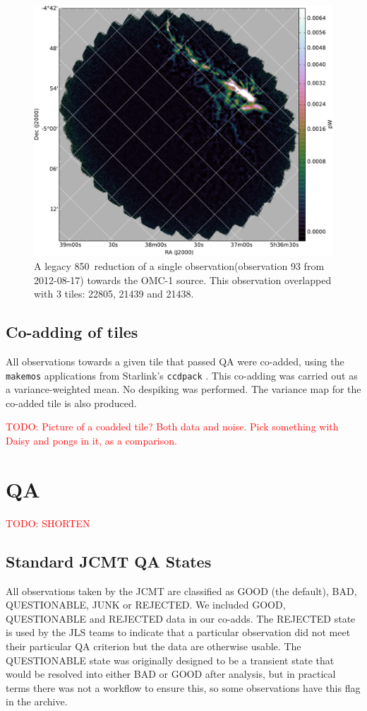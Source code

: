 \documentclass[twocolumn]{aastex6}
\newcommand{\um}{\micron}
\newcommand{\todo}[1]{\textcolor{red}{TODO: #1}}
\newcommand{\ascl}[1]{\href{http://www.ascl.net/#1}{ascl:#1}}
\newcommand{\status}[1]{\textsf{#1}}
\begin{document}
\begin{figure}
  \centering
  \includegraphics[width=0.6\linewidth]{omc1_example_legacy}
  \caption{A legacy 850\,\um{} reduction of a single
    observation(observation 93 from 2012-08-17) towards the OMC-1
    source. This observation overlapped with 3 tiles: 22805, 21439 and
    21438. }
  \label{fig:omc1-example}
    \end{figure}


\subsection{Co-adding of tiles}
All observations towards a given tile that passed QA were co-added,
using the \texttt{makemos} applications from Starlink's
\texttt{ccdpack} \citep[][\ascl{1403.021}]{SUN139}. This co-adding was
carried out as a variance-weighted mean. No despiking was
performed. The variance map for the co-added tile is also produced.

\todo{Picture of a coadded tile? Both data and noise. Pick something
with Daisy and pongs in it, as a comparison.}




\section{QA}
\label{sec:QA}
\todo{SHORTEN}

\subsection{Standard JCMT QA States}
All observations taken by the JCMT are classified as \status{GOOD}
(the default), \status{BAD}, \status{QUESTIONABLE}, \status{JUNK} or
\status{REJECTED}. We included \status{GOOD}, \status{QUESTIONABLE}
and \status{REJECTED} data in our co-adds. The \status{REJECTED} state
is used by the JLS teams to indicate that a particular observation did
not meet their particular QA criterion but the data are otherwise
usable. The \status{QUESTIONABLE} state was originally designed to be
a transient state that would be resolved into either \status{BAD} or
\status{GOOD} after analysis, but in practical terms there was not a
workflow to ensure this, so some observations have this flag in the
archive.
\end{document}
